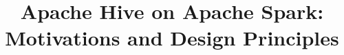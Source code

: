\documentclass{vldb}
\begin{document}


\title{Apache Hive on Apache Spark: Motivations and Design Principles}



%
%
%
%

\end{document}
